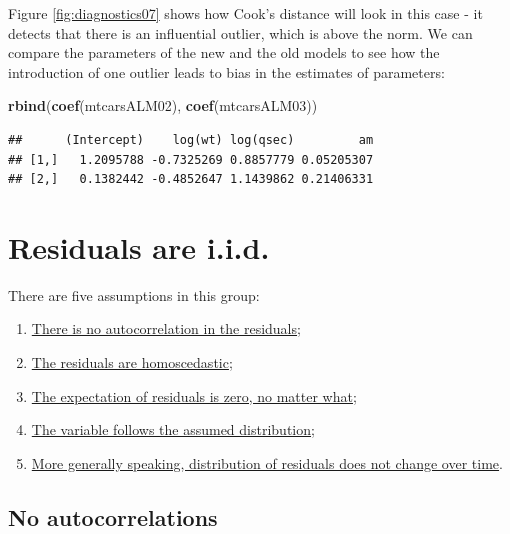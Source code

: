 \documentclass[
]{book}
\newenvironment{Shaded}{\begin{snugshade}}{\end{snugshade}}
\newcommand{\FunctionTok}[1]{\textcolor[rgb]{0.13,0.29,0.53}{\textbf{#1}}}
\newcommand{\NormalTok}[1]{#1}
\providecommand{\tightlist}{%
  \setlength{\itemsep}{0pt}\setlength{\parskip}{0pt}}
\theoremstyle{definition}
\theoremstyle{definition}
\theoremstyle{definition}
\theoremstyle{definition}
\theoremstyle{remark}
\begin{document}
Figure \ref{fig:diagnostics07} shows how Cook's distance will look in this case - it detects that there is an influential outlier, which is above the norm. We can compare the parameters of the new and the old models to see how the introduction of one outlier leads to bias in the estimates of parameters:

\begin{Shaded}
\begin{Highlighting}[]
\FunctionTok{rbind}\NormalTok{(}\FunctionTok{coef}\NormalTok{(mtcarsALM02),}
      \FunctionTok{coef}\NormalTok{(mtcarsALM03))}
\end{Highlighting}
\end{Shaded}

\begin{verbatim}
##      (Intercept)    log(wt) log(qsec)         am
## [1,]   1.2095788 -0.7325269 0.8857779 0.05205307
## [2,]   0.1382442 -0.4852647 1.1439862 0.21406331
\end{verbatim}

\section{Residuals are i.i.d.}\label{assumptionsResidualsAreIID}

There are five assumptions in this group:

\begin{enumerate}
\def\labelenumi{\arabic{enumi}.}
\tightlist
\item
  \hyperref[assumptionsResidualsAreIIDAutocorrelations]{There is no autocorrelation in the residuals};
\item
  \hyperref[assumptionsResidualsAreIIDHomoscedasticity]{The residuals are homoscedastic};
\item
  \hyperref[assumptionsResidualsAreIIDMean]{The expectation of residuals is zero, no matter what};
\item
  \hyperref[assumptionsDistribution]{The variable follows the assumed distribution};
\item
  \hyperref[assumptionsDistributionFixed]{More generally speaking, distribution of residuals does not change over time}.
\end{enumerate}

\subsection{No autocorrelations}\label{assumptionsResidualsAreIIDAutocorrelations}
\end{document}

